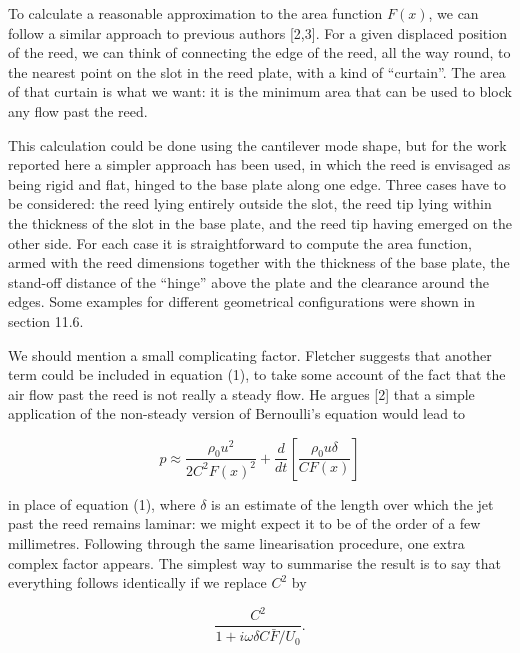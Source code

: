   To calculate a reasonable approximation to the area function $F(x)$, we can 
  follow a similar approach to previous authors [2,3]. For a given displaced 
  position of the reed, we can think of connecting the edge of the reed, all 
  the way round, to the nearest point on the slot in the reed plate, with a 
  kind of ``curtain''. The area of that curtain is what we want: it is the 
  minimum area that can be used to block any flow past the reed. 

  This calculation could be done using the cantilever mode shape, but for the 
  work reported here a simpler approach has been used, in which the reed is 
  envisaged as being rigid and flat, hinged to the base plate along one edge. 
  Three cases have to be considered: the reed lying entirely outside the slot, 
  the reed tip lying within the thickness of the slot in the base plate, and 
  the reed tip having emerged on the other side. For each case it is 
  straightforward to compute the area function, armed with the reed dimensions 
  together with the thickness of the base plate, the stand-off distance of the 
  ``hinge'' above the plate and the clearance around the edges. Some examples 
  for different geometrical configurations were shown in section 11.6. 

  We should mention a small complicating factor. Fletcher suggests that another 
  term could be included in equation (1), to take some account of the fact that 
  the air flow past the reed is not really a steady flow. He argues [2] that a 
  simple application of the non-steady version of Bernoulli's equation would 
  lead to 

  \begin{equation*}p \approx \dfrac{\rho_0 u^2}{2 C^2 F(x)^2} + \dfrac{d}{dt} 
  \left[ \dfrac{\rho_0 u \delta}{C F(x)} \right] \tag{18}\end{equation*} 

  \noindent{}in place of equation (1), where $\delta$ is an estimate of the 
  length over which the jet past the reed remains laminar: we might expect it 
  to be of the order of a few millimetres. Following through the same 
  linearisation procedure, one extra complex factor appears. The simplest way 
  to summarise the result is to say that everything follows identically if we 
  replace $C^2$ by 

  \begin{equation*}\dfrac{C^2}{1+i \omega \delta C \bar{F}/U_0}. 
  \tag{19}\end{equation*} 

